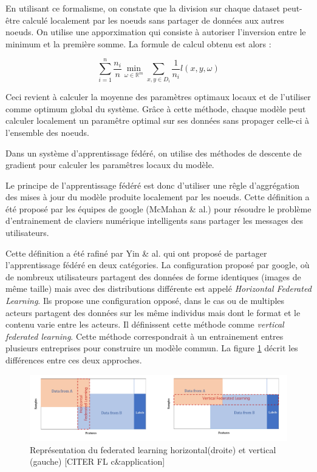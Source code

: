 \documentclass[stage3a]{tnreport} %
\begin{document}
En utilisant ce formalisme, on constate que la division sur chaque dataset peut-être calculé localement par les noeuds sans partager de données aux autres noeuds. On utilise une apporximation qui consiste à autoriser l'inversion entre le minimum et la première somme. La formule de calcul obtenu est alors :

\begin{equation}
  \sum_{i = 1}^n \frac{n_i}{n} \min_{\omega \in \mathbb{R}^m} \sum_{x,y \in D_i}\frac{1}{n_i}l(x,y,\omega) 
\end{equation}

Ceci revient à calculer la moyenne des paramètres optimaux locaux et de l'utiliser comme optimum global du système. Grâce à cette méthode, chaque modèle peut calculer localement un paramêtre optimal sur ses données sans propager celle-ci à l'ensemble des noeuds. 

Dans un système d'apprentissage fédéré, on utilise des méthodes de descente de gradient pour calculer les paramêtres locaux du modèle.

Le principe de l'apprentissage fédéré est donc d'utiliser une rêgle d'aggrégation des mises à jour du modèle produite localement par les noeuds. Cette définition a été proposé par les équipes de google (McMahan \& al.) pour résoudre le problème d'entrainement de claviers numérique intelligents sans partager les messages des utilisateurs.

Cette définition a été rafiné par Yin \& al. qui ont proposé de partager l'apprentissage fédéré en deux catégories. La configuration proposé par google, où de nombreux utilisateurs partagent des données de forme identiques (images de même taille) mais avec des distributions différente est appelé \textit{Horizontal Federated Learning}. Ils propose une configuration opposé, dans le cas ou de multiples acteurs partagent des données sur les même individus mais dont le format et le contenu varie entre les acteurs. Il définissent cette méthode comme  \textit{vertical federated learning}. Cette méthode correspondrait à un entrainement entres plusieurs entreprises pour construire un modèle commun. La figure \ref{fig:horizontal_vertical} décrit les différences entre ces deux approches.

\begin{figure}[]
  \centering
  \includegraphics[scale=1.60]{figures/horizontalvsvertical.png}
  \caption{Représentation du federated learning horizontal(droite) et vertical (gauche) [CITER FL c\&application]}
  \label{fig:horizontal_vertical}
\end{figure}
\end{document}
